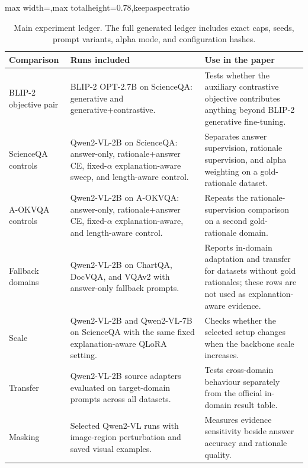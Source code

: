 \documentclass[preprint,12pt]{elsarticle}
\begin{document}
\begin{table}[!htbp]
\centering
\caption{Main experiment ledger. The full generated ledger includes exact caps, seeds, prompt variants, alpha mode, and configuration hashes.}
\label{tab:ExperimentLedger}
\scriptsize
\renewcommand{\arraystretch}{1.05}
\begin{adjustbox}{max width=\textwidth,max totalheight=0.78\textheight,keepaspectratio}
\begin{tabular}{|>{\raggedright\arraybackslash}p{}|>{\raggedright\arraybackslash}p{}|>{\raggedright\arraybackslash}p{}|}
\hline
\textbf{Comparison} & \textbf{Runs included} & \textbf{Use in the paper} \\ \hline
BLIP-2 objective pair & BLIP-2 OPT-2.7B on ScienceQA: generative and generative+contrastive. & Tests whether the auxiliary contrastive objective contributes anything beyond BLIP-2 generative fine-tuning. \\
ScienceQA controls & Qwen2-VL-2B on ScienceQA: answer-only, rationale+answer CE, fixed-$\alpha$ explanation-aware sweep, and length-aware control. & Separates answer supervision, rationale supervision, and alpha weighting on a gold-rationale dataset. \\
A-OKVQA controls & Qwen2-VL-2B on A-OKVQA: answer-only, rationale+answer CE, fixed-$\alpha$ explanation-aware, and length-aware control. & Repeats the rationale-supervision comparison on a second gold-rationale domain. \\
Fallback domains & Qwen2-VL-2B on ChartQA, DocVQA, and VQAv2 with answer-only fallback prompts. & Reports in-domain adaptation and transfer for datasets without gold rationales; these rows are not used as explanation-aware evidence. \\
Scale & Qwen2-VL-2B and Qwen2-VL-7B on ScienceQA with the same fixed explanation-aware QLoRA setting. & Checks whether the selected setup changes when the backbone scale increases. \\
Transfer & Qwen2-VL-2B source adapters evaluated on target-domain prompts across all datasets. & Tests cross-domain behaviour separately from the official in-domain result table. \\
Masking & Selected Qwen2-VL runs with image-region perturbation and saved visual examples. & Measures evidence sensitivity beside answer accuracy and rationale quality. \\ \hline
\end{tabular}
\end{adjustbox}
\end{table}
\end{document}
